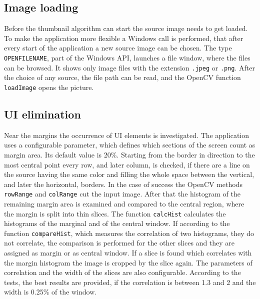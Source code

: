\documentclass[draft,final]{vutinfth} %
\begin{document}
\subsection{Image loading}
Before the thumbnail algorithm can start the source image needs to get loaded.
To make the application more flexible a Windows call is performed, that after every start of the application a new source image can be chosen.
The type \texttt{OPENFILENAME}, part of the Windows API, launches a file window, where the files can be browsed.
It shows only image files with the extension \texttt{.jpeg} or \texttt{.png}.
After the choice of any source, the file path can be read, and the OpenCV function \texttt{loadImage} opens the picture.

\subsection{UI elimination}
Near the margins the occurrence of UI elements is investigated.
The application uses a configurable parameter, which defines which sections of the screen count as margin area. 
Its default value is 20\%. 
Starting from the border in direction to the most central point every row, and later column, is checked, if there are a line on the source having the same color and filling the whole space between the vertical, and later the horizontal, borders.
In the case of success the OpenCV methods \texttt{rowRange} and \texttt{colRange} cut the input image.
After that the histogram of the remaining margin area is examined and compared to the central region, where the margin is split into thin slices.
The function \texttt{calcHist} calculates the histograms of the marginal and of the central window.
If according to the function \texttt{compareHist}, which measures the correlation of two histograms,%
 they do not correlate, the comparison is performed for the other slices and they are assigned as margin or as central window.
If a slice is found which correlates with the margin histogram the image is cropped by the slice again. 
The parameters of correlation and the width of the slices are also configurable.
According to the tests, the best results are provided, if the correlation is between 1.3 and 2 and the width is 0.25\% of the window.
\end{document}
